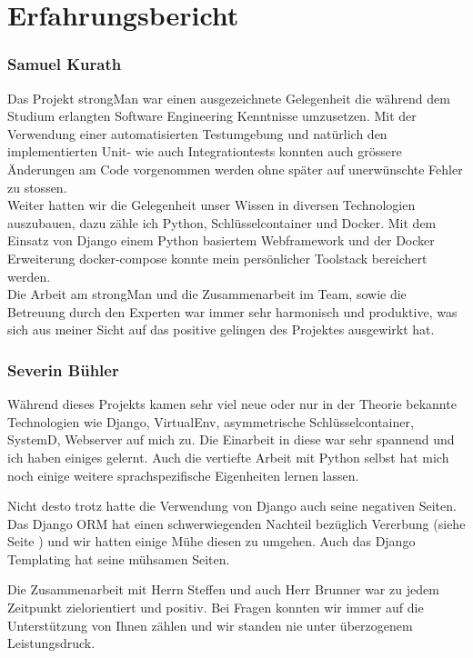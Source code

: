\section{Erfahrungsbericht}
\subsubsection{Samuel Kurath}
Das Projekt strongMan war einen ausgezeichnete Gelegenheit die während dem Studium erlangten Software Engineering Kenntnisse umzusetzen. Mit der Verwendung einer automatisierten Testumgebung und natürlich den implementierten Unit- wie auch Integrationtests konnten auch grössere Änderungen am Code vorgenommen werden ohne später auf unerwünschte Fehler zu stossen.\\
Weiter hatten wir die Gelegenheit unser Wissen in diversen Technologien auszubauen, dazu zähle ich Python, Schlüsselcontainer und Docker. Mit dem Einsatz von Django einem Python basiertem Webframework und der Docker Erweiterung docker-compose konnte mein persönlicher Toolstack bereichert werden.\\
Die Arbeit am strongMan und die Zusammenarbeit im Team, sowie die Betreuung durch den Experten war immer sehr harmonisch und produktive, was sich aus meiner Sicht auf das positive gelingen des Projektes ausgewirkt hat.


\subsubsection{Severin Bühler}
Während dieses Projekts kamen sehr viel neue oder nur in der Theorie bekannte Technologien wie Django, VirtualEnv, asymmetrische Schlüsselcontainer, SystemD, Webserver auf mich zu. Die Einarbeit in diese war sehr spannend und ich haben einiges gelernt. Auch die vertiefte Arbeit mit Python selbst hat mich noch einige weitere sprachspezifische Eigenheiten lernen lassen.

Nicht desto trotz hatte die Verwendung von Django auch seine negativen Seiten. Das Django ORM hat einen schwerwiegenden Nachteil bezüglich Vererbung (siehe Seite \pageref{subklassen}) und wir hatten einige Mühe diesen zu umgehen. Auch das Django Templating hat seine mühsamen Seiten.

Die Zusammenarbeit mit Herrn Steffen und auch Herr Brunner war zu jedem Zeitpunkt zielorientiert und positiv. Bei Fragen konnten wir immer auf die Unterstützung von Ihnen zählen und wir standen nie unter überzogenem Leistungsdruck. 